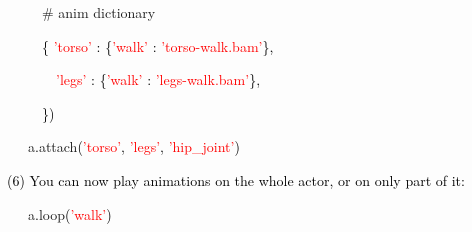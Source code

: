 \documentclass[a4paper]{article}
\newcommand\textstyleOOoComputerKeyWord[1]{\textrm{\textcolor[rgb]{0.0,0.0,0.5019608}{#1}}}
\newcommand\textstyleOOoComputerIdent[1]{\textrm{\textcolor[rgb]{0.0,0.5019608,0.0}{#1}}}
\newcommand\textstyleOOoComputerBase[1]{\textrm{\textcolor{black}{#1}}}
\newcommand\textstyleOOoComputerLiteral[1]{\textrm{\textcolor{red}{#1}}}
\newcommand\textstyleOOoComputerComment[1]{\textrm{\textcolor[rgb]{0.29803923,0.29803923,0.29803923}{#1}}}
\begin{document}
{\color{black}
\textstyleOOoComputerKeyWord{\textcolor{black}{\ \ \ \ \ }}\textstyleOOoComputerComment{\# anim dictionary}}

{\color{black}
\textstyleOOoComputerKeyWord{\textcolor{black}{\ \ \ \ \ }}\textstyleOOoComputerBase{\{}\textstyleOOoComputerKeyWord{\textcolor{black}{
}}\textstyleOOoComputerLiteral{{}'torso'}\textstyleOOoComputerKeyWord{\textcolor{black}{
}}\textstyleOOoComputerBase{:}\textstyleOOoComputerKeyWord{\textcolor{black}{
}}\textstyleOOoComputerBase{\{}\textstyleOOoComputerLiteral{{}'walk'}\textstyleOOoComputerKeyWord{\textcolor{black}{
}}\textstyleOOoComputerBase{:}\textstyleOOoComputerKeyWord{\textcolor{black}{
}}\textstyleOOoComputerLiteral{{}'torso-walk.bam'}\textstyleOOoComputerBase{\},}}

{\color{black}
\textstyleOOoComputerKeyWord{\textcolor{black}{\ \ \ \ \ \ \ }}\textstyleOOoComputerLiteral{{}'legs'}\textstyleOOoComputerKeyWord{\textcolor{black}{
}}\textstyleOOoComputerBase{:}\textstyleOOoComputerKeyWord{\textcolor{black}{
}}\textstyleOOoComputerBase{\{}\textstyleOOoComputerLiteral{{}'walk'}\textstyleOOoComputerKeyWord{\textcolor{black}{
}}\textstyleOOoComputerBase{:}\textstyleOOoComputerKeyWord{\textcolor{black}{
}}\textstyleOOoComputerLiteral{{}'legs-walk.bam'}\textstyleOOoComputerBase{\},}}

{\color{black}
\textstyleOOoComputerKeyWord{\textcolor{black}{\ \ \ \ \ }}\textstyleOOoComputerBase{\})}}

\clearpage{\color{black}
\textstyleOOoComputerKeyWord{\textcolor{black}{\ \ \ }}\textstyleOOoComputerComment{\# Tell the Actor how to stack the
pieces.}}

{\color{black}
\textstyleOOoComputerKeyWord{\textcolor{black}{\ \ \ }}\textstyleOOoComputerIdent{a}\textstyleOOoComputerBase{.}\textstyleOOoComputerIdent{attach}\textstyleOOoComputerBase{(}\textstyleOOoComputerLiteral{{}'torso'}\textstyleOOoComputerBase{,}\textstyleOOoComputerKeyWord{\textcolor{black}{
}}\textstyleOOoComputerLiteral{{}'legs'}\textstyleOOoComputerBase{,}\textstyleOOoComputerKeyWord{\textcolor{black}{
}}\textstyleOOoComputerLiteral{{}'hip\_joint'}\textstyleOOoComputerBase{)}}


\bigskip

{\color{black}
\textstyleOOoComputerKeyWord{\textcolor{black}{(6) You can now play animations on the whole actor, or on only part of
it:}}}


\bigskip

{\color{black}
\textstyleOOoComputerKeyWord{\textcolor{black}{\ \ \ }}\textstyleOOoComputerIdent{a}\textstyleOOoComputerBase{.}\textstyleOOoComputerIdent{loop}\textstyleOOoComputerBase{(}\textstyleOOoComputerLiteral{{}'walk'}\textstyleOOoComputerBase{)}}
\end{document}
